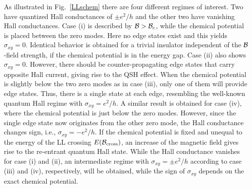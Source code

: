 \documentclass{article}
\begin{document}
As illustrated in Fig.~\ref{LLschem} there are four different
regimes of interest. Two have quantized Hall conductances of $\pm
e^2/h$ and the other two have vanishing Hall conductances. Case
(i) is described by ${\cal{B}}>{\cal{B}}_c$, while the chemical
potential is placed between the zero modes. Here no edge states
exist and this yields  $\sigma_{xy}=0$. Identical behavior is
obtained for a trivial insulator independent of the
${\cal{B}}$-field strength, if the chemical potential is in the
energy gap. Case (ii) also shows $\sigma_{xy}=0$. However, there
should be counter-propagating edge states that carry opposite Hall
current, giving rise to the QSH effect. When the chemical
potential is slightly below the two zero modes as in case (iii),
only one of them will provide edge states. Thus, there is a single
state at each edge, resembling the well-known quantum Hall regime
with $\sigma_{xy}=e^2/h$. A similar result is obtained for case
(iv), where the chemical potential is just below the zero modes.
However, since the single edge state now originates from the other
zero mode, the Hall conductance changes sign, i.e.,
$\sigma_{xy}=-e^2/h$. If the chemical potential is fixed and
unequal to the energy of the LL crossing $E({\cal{B}}_{\rm
cross})$, an increase of the magnetic field gives rise to the
re-entrant quantum Hall state. While the Hall conductance vanishes
for case (i) and (ii), an intermediate regime with
$\sigma_{xy}=\pm e^2/h$ according to case (iii) and (iv),
respectively, will be obtained, while the sign of $\sigma_{xy}$
depends on the exact chemical potential.
\end{document}
